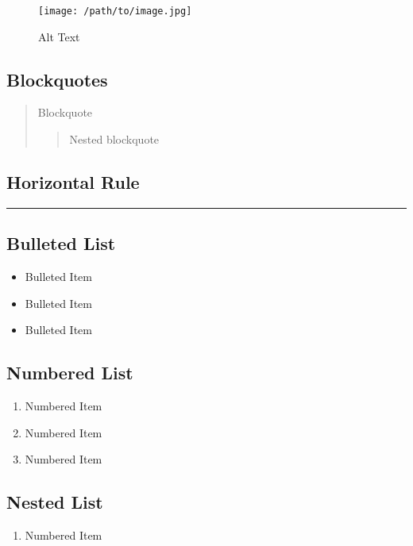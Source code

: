 \begin{figure}[htbp]
\centering
\texttt{[image: /path/to/image.jpg]}
\caption{Alt Text}
\end{figure}

\subsection{Blockquotes}

\begin{quote}
Blockquote
\begin{quote}
Nested blockquote
\end{quote}
\end{quote}

\subsection{Horizontal Rule}

\hrule

\subsection{Bulleted List}

\begin{itemize}
\tightlist
\item
  Bulleted Item
\item
  Bulleted Item
\item
  Bulleted Item
\end{itemize}

\subsection{Numbered List}

\begin{enumerate}
\def\labelenumi{\arabic{enumi}.}
\item
  Numbered Item
\item
  Numbered Item
\item
  Numbered Item
\end{enumerate}

\subsection{Nested List}

\begin{enumerate}
\def\labelenumi{\arabic{enumi}.}
\tightlist
\item
  Numbered Item
\end{enumerate}

